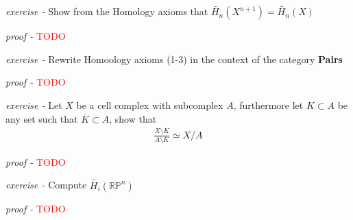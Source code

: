 \documentclass[11pt]{article}
\theoremstyle{definition}
\begin{document}
    \emph{exercise - }\label{HEx14} Show from the Homology axioms that \(\tilde{H_n}(X^{n+1}) = \tilde{H_n}(X)\)

    \emph{proof - }\textcolor{red}{TODO}


    \emph{exercise - }\label{HEx15} Rewrite Homoology axioms (1-3) in the context of the category \textbf{Pairs}

    \emph{proof - }\textcolor{red}{TODO}


    \emph{exercise - }\label{HEx16} Let \(X\) be a cell complex with subcomplex \(A\), furthermore let \(K \subset A\) be any set such that \(\overline{K} \subset A\), show that
    \begin{align*}
        \frac{X \setminus K}{A \setminus K} \simeq X/A
    \end{align*}

    \emph{proof - }\textcolor{red}{TODO}


    \emph{exercise - }\label{HEx17} Compute \(\tilde{H_i}(\mathbb{RP}^n)\)

    \emph{proof - }\textcolor{red}{TODO}
\end{document}
